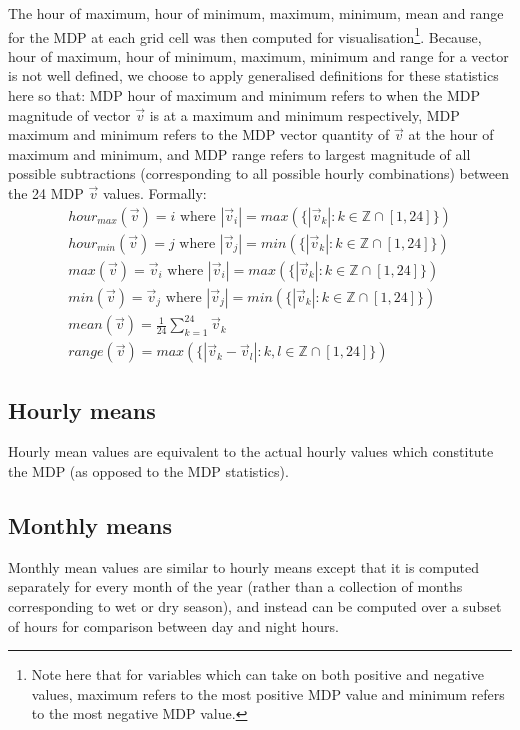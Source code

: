 The hour of maximum, hour of minimum, maximum, minimum, mean and range for the \ac{MDP} at each grid cell was then computed for visualisation\footnote{Note here that for variables which can take on both positive and negative values, maximum refers to the most positive \ac{MDP} value and minimum refers to the most negative \ac{MDP} value.}. Because, hour of maximum, hour of minimum, maximum, minimum and range for a vector is not well defined, we choose to apply generalised definitions for these statistics here so that: \ac{MDP} hour of maximum and minimum refers to when the \ac{MDP} magnitude of vector $\vec{v}$ is at a maximum and minimum respectively, \ac{MDP} maximum and minimum refers to the \ac{MDP} vector quantity of $\vec{v}$ at the hour of maximum and minimum, and \ac{MDP} range refers to largest magnitude of all possible subtractions (corresponding to all possible hourly combinations) between the 24 \ac{MDP} $\vec{v}$ values. Formally:
\begin{eqnarray}
	hour_{max}(\vec{v}) = i \mbox{ where } |\vec{v}_i| = max( \{|\vec{v}_k| : k \in \mathbb{Z} \cap [1,24] \}) \\
	hour_{min}(\vec{v}) = j \mbox{ where } |\vec{v}_j| = min( \{|\vec{v}_k| : k \in \mathbb{Z} \cap [1,24] \}) \\
	max(\vec{v}) = \vec{v}_i \mbox{ where } |\vec{v}_i| = max( \{|\vec{v}_k| : k \in \mathbb{Z} \cap [1,24] \}) \\
	min(\vec{v}) = \vec{v}_j \mbox{ where } |\vec{v}_j| = min( \{|\vec{v}_k| : k \in \mathbb{Z} \cap [1,24] \}) \\
	mean(\vec{v}) = \frac{1}{24} \sum_{k=1}^{24} \vec{v}_k \\
	range(\vec{v}) = max(\{|\vec{v}_k - \vec{v}_l| : k,l \in \mathbb{Z} \cap [1,24] \})
\end{eqnarray}

\subsection{Hourly means}

Hourly mean values are equivalent to the actual hourly values which constitute the \ac{MDP} (as opposed to the \ac{MDP} statistics).

\subsection{Monthly means}

Monthly mean values are similar to hourly means except that it is computed separately for every month of the year (rather than a collection of months corresponding to wet or dry season), and instead can be computed over a subset of hours for comparison between day and night hours.

